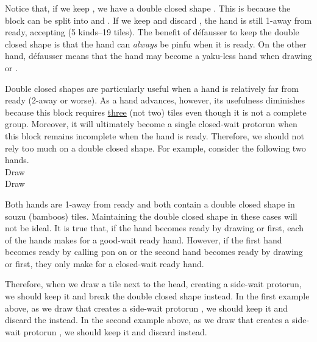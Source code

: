 {\bigskip
Notice that, if we keep {\LARGE{}}, we have a double closed shape {\LARGE{}}. This is because the block {\LARGE{}} can be split into {\LARGE{}} and {\LARGE{}}. 
If we keep {\LARGE{}} and discard {\LARGE{}}, the hand is still 1-away from ready, accepting {\LARGE{}} (5 kinds--19 tiles). The benefit of défausser {\LARGE{}} to keep the double closed shape is that the hand can \emph{always} be {\jap pinfu} when it is ready. On the other hand, défausser {\LARGE{}} means that the hand may become a {\jap yaku}-less hand when drawing {\LARGE{}} or {\LARGE{}}.

\bigskip
Double closed shapes are particularly useful when a hand is relatively far from ready (2-away or worse). As a hand advances, however, its usefulness diminishes because this block requires \underline{three} (not two) tiles even though it is not a complete group. 
Moreover, it will ultimately become a single closed-wait protorun when this block remains incomplete when the hand is ready. 
Therefore, we should not rely too much on a double closed shape. 
For example, consider the following two hands. 
\bp
{}\zhong\zhong~\\
\hfill\footnotesize{Draw~~~~~~~~~~~~~~~}
\ep 
\vspace{-20pt}
\bp
{}~\\
\hfill\footnotesize{Draw~~~~~~~~~~~~~~~}
\ep

Both hands are 1-away from ready and both contain a double closed shape in {\jap souzu} (bamboos) tiles. Maintaining the double closed shape in these cases will not be ideal. 
It is true that, if the hand becomes ready by drawing {\LARGE{}} or  {\LARGE{}} first, each of the hands makes for a good-wait ready hand. However, if the first hand becomes ready by calling {\jap pon} on {\LARGE\zhong} or the second hand becomes ready by drawing {\LARGE{}} or {\LARGE{}} first, they only make for a closed-wait ready hand. 

\bigskip
Therefore, when we draw a tile next to the head, creating a side-wait protorun, we should keep it and break the double closed shape instead. In the first example above, as we draw {\LARGE{}} that creates a side-wait protorun {\LARGE{}}, we should keep it and discard the {\LARGE{}} instead. In the second example above, as we draw {\LARGE{}} that creates a side-wait protorun {\LARGE{}}, we should keep it and discard {\LARGE{}} instead. 

}
